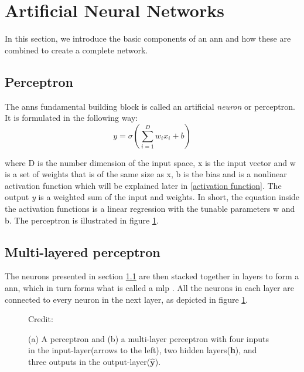 \section{Artificial Neural Networks} \label{neural networks}
    In this section, we introduce the basic components of an \gls{ann} and how these are combined to create a complete network.

    \subsection{Perceptron} \label{perceptron}
        The \gls{ann}s fundamental building block is called an artificial \textit{neuron} or perceptron. It is formulated in the following way\cite{razavi2021deep_exp_per}:
            \begin{equation} \label{eq_perceptron}
                y = \sigma(\sum_{i=1}^{D}w_ix_i + b)
            \end{equation}
            
        where D is the number dimension of the input space, x is the input vector and w is a set of weights that is of the same size as x, b is the bias and {\textsigma} is a nonlinear activation function which will be explained later in \ref{activation function}. The output \textit{y} is a weighted sum of the input and weights. In short, the equation inside the activation functions is a linear regression with the tunable parameters w and b. The perceptron is illustrated in figure \ref{Perceptron / MLP}.
    
    \subsection{Multi-layered perceptron} \label{MLP}
        The neurons presented in section \ref{perceptron} are then stacked together in layers to form a \gls{ann}, which in turn forms what is called a \gls{mlp} \cite{razavi2021deep_exp_per}. All the neurons in each layer are connected to every neuron in the next layer, as depicted in figure \ref{Perceptron / MLP}.
        
            \begin{figure}[H]
                \centering
                
                \caption[The perceptron and multi-layer perceptron]{(a) A perceptron and (b) a multi-layer perceptron with four inputs in the input-layer(arrows to the left), two hidden layers(\textbf{h}), and three outputs in the output-layer($\hat{\textbf{y}}$).}
              	\medskip 
                \hspace*{15pt}\hbox{\scriptsize Credit: \citeauthor{razavi2021deep_exp_DL}\cite{razavi2021deep_exp_DL}}
                \label{Perceptron / MLP}
            \end{figure}
        
